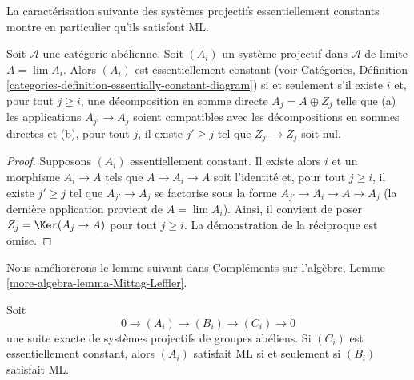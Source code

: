 \noindent
La caractérisation suivante des systèmes projectifs essentiellement constants
montre en particulier qu'ils satisfont ML.

\begin{lemma}
\label{lemma-essentially-constant}
Soit $\mathcal{A}$ une catégorie abélienne.
Soit $(A_i)$ un système projectif dans $\mathcal{A}$ de limite
$A = \lim A_i$.
Alors $(A_i)$ est essentiellement constant (voir
Catégories, Définition
\ref{categories-definition-essentially-constant-diagram})
si et seulement s'il existe $i$ et, pour tout $j \geq i$, une décomposition
en somme directe $A_j = A \oplus Z_j$ telle que
(a) les applications $A_{j'} \to A_j$ soient compatibles avec les
décompositions en sommes directes et (b), pour tout $j$, il existe
$j' \geq j$ tel que $Z_{j'} \to Z_j$ soit nul.
\end{lemma}

\begin{proof}
Supposons $(A_i)$ essentiellement constant. Il existe alors $i$ et
un morphisme $A_i \to A$ tels que $A \to A_i \to A$ soit l'identité et,
pour tout $j \geq i$, il existe
$j' \geq j$ tel que $A_{j'} \to A_j$ se factorise sous la forme
$A_{j'} \to A_i \to A \to A_j$ (la dernière application provient de
$A = \lim A_i$).
Ainsi, il convient de poser $Z_j = \Ker(A_j \to A)$ pour tout $j \geq i$.
La démonstration de la réciproque est omise.
\end{proof}

\noindent
Nous améliorerons le lemme suivant dans
Compléments sur l'algèbre, Lemme \ref{more-algebra-lemma-Mittag-Leffler}.

\begin{lemma}
\label{lemma-exact-sequence-ML}
Soit
$$
0 \to (A_i) \to (B_i) \to (C_i) \to 0
$$
une suite exacte de systèmes projectifs de groupes abéliens.
Si $(C_i)$ est essentiellement constant, alors $(A_i)$ satisfait ML
si et seulement si $(B_i)$ satisfait ML.
\end{lemma}

